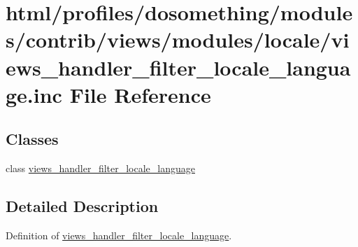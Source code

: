 \hypertarget{views__handler__filter__locale__language_8inc}{
\section{html/profiles/dosomething/modules/contrib/views/modules/locale/views\_\-handler\_\-filter\_\-locale\_\-language.inc File Reference}
\label{views__handler__filter__locale__language_8inc}
}
\subsection*{Classes}
\begin{DoxyCompactItemize}
\item 
class \hyperlink{classviews__handler__filter__locale__language}{views\_\-handler\_\-filter\_\-locale\_\-language}
\end{DoxyCompactItemize}


\subsection{Detailed Description}
Definition of \hyperlink{classviews__handler__filter__locale__language}{views\_\-handler\_\-filter\_\-locale\_\-language}. 